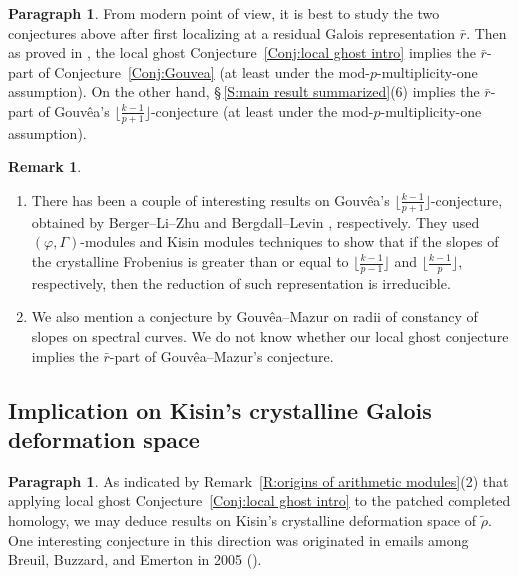 \documentclass[12pt]{amsart}
\theoremstyle{definition}
\newtheorem{remark}[subsection]{Remark}
\newtheorem{para}[subsection]{Paragraph}
\numberwithin{equation}{subsection}
\begin{document}
\begin{para}
\label{P:para_023}
From modern point of view, it is best to study the two conjectures above after first localizing at a residual Galois representation $\bar r$.  Then as proved in \cite{bergdall-pollack3}, the local ghost Conjecture~\ref{Conj:local ghost intro} implies the $\bar r$-part of Conjecture~\ref{Conj:Gouvea} (at least under the mod-$p$-multiplicity-one assumption). On the other hand, \S\,\ref{S:main result summarized}(6) implies the $\bar r$-part of  Gouv\^ea's $\big\lfloor\frac{k-1}{p+1}\big\rfloor$-conjecture (at least under the mod-$p$-multiplicity-one assumption).
\end{para}

\begin{remark}
\begin{enumerate}
\item 
There has been a couple of interesting results on Gouv\^ea's $\big\lfloor \frac{k-1}{p+1}\big\rfloor$-conjecture, obtained by Berger--Li--Zhu \cite{berger-li-zhu} and Bergdall--Levin \cite{bergdall-levin}, respectively. They used $(\varphi, \Gamma)$-modules and Kisin modules techniques to show that if the slopes of the crystalline Frobenius is greater than or equal to $\big \lfloor \frac{k-1}{p-1}\big\rfloor$ and $\big\lfloor\frac{k-1}p\rfloor$, respectively, then the reduction of such representation is irreducible. 


\item
We also mention a conjecture by Gouv\^ea--Mazur \cite[Conjecture 1]{gouvea-mazur} on radii of constancy of slopes on spectral curves. We do not know whether our local ghost conjecture implies the $\bar r$-part of Gouv\^ea--Mazur's conjecture. 
\end{enumerate}
\end{remark}




\subsection{Implication on Kisin's crystalline Galois deformation space}
\begin{para}
\label{P:para_024}
As indicated by Remark~\ref{R:origins of arithmetic modules}(2) that applying local ghost Conjecture~\ref{Conj:local ghost intro} to the patched completed homology, we may deduce results on Kisin's crystalline deformation  space of $\tilde \rho$. One interesting conjecture in this direction was 
 originated in
emails among Breuil, Buzzard, and Emerton in 2005 (\cite{buzzard-gee}).
\end{para}
\end{document}
